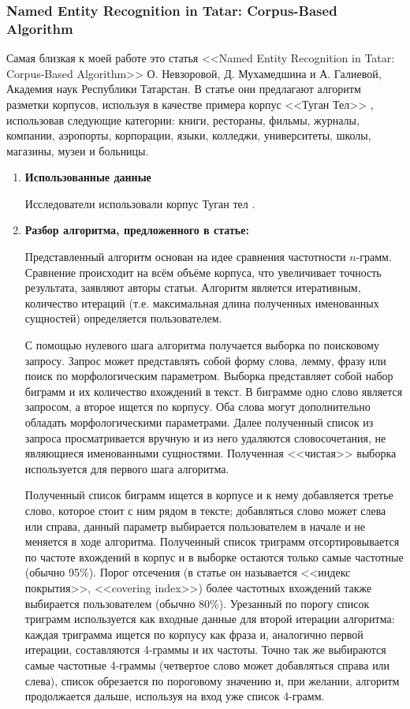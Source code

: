\subsubsection{Named Entity Recognition in Tatar: Corpus-Based Algorithm}

Самая близкая к моей работе это статья <<Named Entity Recognition in Tatar:
Corpus-Based Algorithm>> О. Невзоровой, Д. Мухамедшина и А. Галиевой, Академия наук Республики Татарстан. В статье они предлагают алгоритм разметки корпусов, используя в качестве примера корпус <<Туган Тел>> \cite{tugan_tel}, использовав следующие категории: книги, рестораны, фильмы, журналы, компании, аэропорты, корпорации, языки, колледжи, университеты, школы, магазины, музеи и больницы. 

\begin{enumerate}

\item\textbf{Использованные данные}

Исследователи использовали корпус Туган тел \cite{tugan_tel}.

\item\textbf{Разбор алгоритма, предложенного в статье:}

Представленный алгоритм основан на идее сравнения частотности $n$-грамм. Сравнение происходит на всём 
объёме корпуса, что увеличивает точность результата, заявляют авторы статьи. Алгоритм является итеративным, количество итераций (т.е. максимальная длина полученных именованных сущностей) определяется пользователем.

С помощью нулевого шага алгоритма получается выборка по поисковому запросу. Запрос может 
представлять собой форму слова, лемму, фразу или поиск по морфологическим параметром. 
Выборка представляет собой набор биграмм и их количество вхождений в текст. В биграмме одно 
слово является запросом, а второе ищется по корпусу. Оба слова могут дополнительно обладать морфологическими параметрами. Далее полученный список из запроса просматривается вручную и из него удаляются словосочетания, не являющиеся именованными сущностями. Полученная <<чистая>> выборка используется для первого шага алгоритма.

Полученный список биграмм ищется в корпусе и к нему добавляется третье слово, которое стоит с ним рядом в тексте; добавляться слово может слева или справа, данный параметр выбирается пользователем в начале и не меняется в ходе алгоритма. Полученный список триграмм отсортировывается по частоте 
вхождений в корпус и в выборке остаются только самые частотные (обычно 95\%). Порог отсечения (в статье он называется <<индекс 
покрытия>>, <<covering index>>) более частотных вхождений также выбирается пользователем (обычно 80\%). 
Урезанный по порогу список триграмм используется как входные данные для второй итерации 
алгоритма: каждая триграмма ищется по корпусу как фраза и, аналогично первой итерации, 
составляются 4-граммы и их частоты. Точно так же выбираются самые частотные 4-граммы 
(четвертое слово может добавляться справа или слева), список обрезается по пороговому значению и, при желании, алгоритм продолжается дальше, используя на вход уже список 4-грамм.


\end{enumerate}
